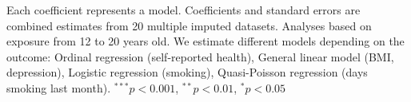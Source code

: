 \begin{table}[htp]
\begin{center}
\begin{threeparttable}
\begin{tabular}{l D{.}{.}{4.3} D{.}{.}{4.5} D{.}{.}{4.3} D{.}{.}{4.5} D{.}{.}{4.5} }
\end{tabular}
\begin{tablenotes}
\scriptsize
\item Each coefficient represents a model. Coefficients and standard errors are combined estimates from 20 multiple imputed datasets. Analyses based on exposure from 12 to 20 years old. We estimate different models depending on the outcome: Ordinal regression (self-reported health), General linear model (BMI, depression), Logistic regression (smoking), Quasi-Poisson regression (days smoking last month). $^{***}p<0.001$, $^{**}p<0.01$, $^*p<0.05$
\end{tablenotes}
\label{tab:nlsy97_q_models}
\end{threeparttable}
\end{center}
\end{table}
